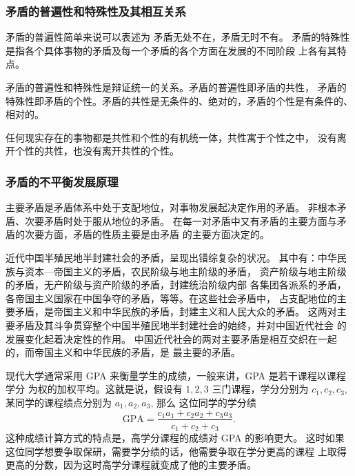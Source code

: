 \documentclass[utf-8, 10pt]{article}
\begin{document}
\subsubsection{矛盾的普遍性和特殊性及其相互关系}

矛盾的普遍性简单来说可以表述为 {\kaishu 矛盾无处不在，矛盾无时不有}。
矛盾的特殊性是指各个具体事物的矛盾及每一个矛盾的各个方面在发展的不同阶段
上各有其特点。

矛盾的普遍性和特殊性是辩证统一的关系。矛盾的普遍性即矛盾的共性，
矛盾的特殊性即矛盾的个性。矛盾的共性是无条件的、绝对的，矛盾的个性是有条件的、
相对的。

任何现实存在的事物都是共性和个性的有机统一体，共性寓于个性之中，
没有离开个性的共性，也没有离开共性的个性。

\subsubsection{矛盾的不平衡发展原理}

主要矛盾是矛盾体系中处于支配地位，对事物发展起决定作用的矛盾。
非根本矛盾、次要矛盾时处于服从地位的矛盾。
在每一对矛盾中又有矛盾的主要方面与矛盾的次要方面，矛盾的性质主要是由矛盾
的主要方面决定的。

\begin{example}
    近代中国半殖民地半封建社会的矛盾，呈现出错综复杂的状况。
    其中有：中华民族与资本—帝国主义的矛盾，农民阶级与地主阶级的矛盾，
    资产阶级与地主阶级的矛盾，无产阶级与资产阶级的矛盾，封建统治阶级内部
    各集团各派系的矛盾，各帝国主义国家在中国争夺的矛盾，等等。在这些社会矛盾中，
    占支配地位的主要矛盾，是帝国主义和中华民族的矛盾，封建主义和人民大众的矛盾。
    这两对主要矛盾及其斗争贯穿整个中国半殖民地半封建社会的始终，并对中国近代社会
    的发展变化起着决定性的作用。
    中国近代社会的两对主要矛盾是相互交织在一起的，而帝国主义和中华民族的矛盾，是
    最主要的矛盾。
\end{example}

\begin{example}
    现代大学通常采用 GPA 来衡量学生的成绩，一般来讲，GPA 是若干课程以课程学分
    为权的加权平均。这就是说，假设有 $1,2,3$ 三门课程，学分分别为
    $c_1, c_2, c_3$, 某同学的课程绩点分别为 $a_1, a_2, a_3$, 那么
    这位同学的学分绩
    \[ \mathrm{GPA} = \dfrac{c_1a_1 + c_2a_2 + c_3a_3}{c_1 + c_2 + c_3}. \]
    这种成绩计算方式的特点是，高学分课程的成绩对 GPA 的影响更大。
    这时如果这位同学想要争取保研，需要学分绩的话，他需要争取在学分更高的课程
    上取得更高的分数，因为这时高学分课程就变成了他的主要矛盾。
\end{example}
\end{document}
